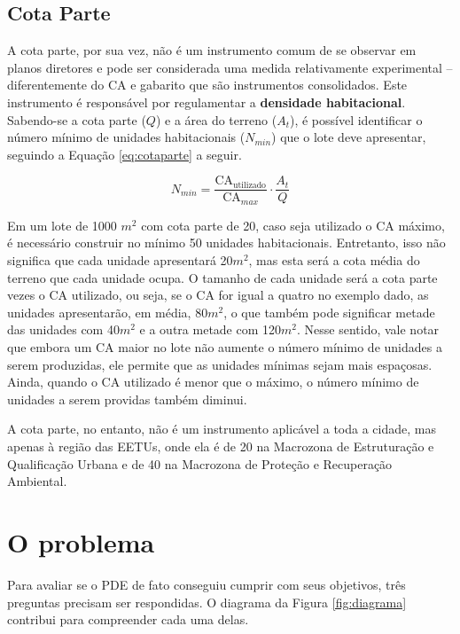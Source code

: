 \subsection*{Cota Parte}

A cota parte, por sua vez, não é um instrumento comum de se observar em planos diretores e pode ser considerada uma medida relativamente experimental -- diferentemente do CA e gabarito que são instrumentos consolidados. Este instrumento é responsável por regulamentar a \textbf{densidade habitacional}. Sabendo-se a cota parte ($Q$) e a área do terreno ($A_t$), é possível identificar o número mínimo de unidades habitacionais ($N_{min}$) que o lote deve apresentar, seguindo a Equação \ref{eq:cotaparte} a seguir. 

\begin{equation}
    N_{min} = \frac{\text{CA}_{\text{utilizado}}}{\text{CA}_{max}}\cdot \frac{A_t}{Q}
    \label{eq:cotaparte}
\end{equation}


Em um lote de 1000 $m^2$ com cota parte de 20, caso seja utilizado o CA máximo, é necessário construir no mínimo 50 unidades habitacionais. Entretanto, isso não significa que cada unidade apresentará 20$m^2$, mas esta será a cota média do terreno que cada unidade ocupa. O tamanho de cada unidade será a cota parte vezes o CA utilizado, ou seja, se o CA for igual a quatro no exemplo dado, as unidades apresentarão, em média, 80$m^2$, o que também pode significar metade das unidades com 40$m^2$ e a outra metade com 120$m^2$. Nesse sentido, vale notar que embora um CA maior no lote não aumente o número mínimo de unidades a serem produzidas, ele permite que as unidades mínimas sejam mais espaçosas. Ainda, quando o CA utilizado é menor que o máximo, o número mínimo de unidades a serem providas também diminui. 

A cota parte, no entanto, não é um instrumento aplicável a toda a cidade, mas apenas à região das EETUs, onde ela é de 20 na Macrozona de Estruturação e Qualificação Urbana e de 40 na Macrozona de Proteção e Recuperação Ambiental.

\section{O problema}
\label{sec:problema}

Para avaliar se o PDE de fato conseguiu cumprir com seus objetivos, três preguntas precisam ser respondidas. O diagrama da Figura \ref{fig:diagrama} contribui para compreender cada uma delas.

